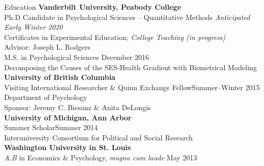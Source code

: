 \begin{rSection}{\textrm{Education}}
{\bf Vanderbilt University, Peabody College}\\
Ph.D Candidate in Psychological Sciences -- Quantitative Methods \hfill{\textit{Anticipated Early Winter 2020}}\\%
\hspace*{\pindent}Certificates in Experimental Education; \textit{College Teaching (in progress)}\\
\hspace*{\pindent}Advisor: Joseph L. Rodgers%
\smallskip\\
M.S. in Psychological Sciences \hfill{December 2016} \\
\hspace*{\pindent}Decomposing the Causes of the SES-Health Gradient with Biometrical Modeling%
\medskip\\
\textbf{University of British Columbia}\\
Visiting International Researcher \& Quinn Exchange Fellow\hfill{Summer--Winter 2015}\\
\hspace*{\pindent}Department of Psychology\\
\hspace*{\pindent}Sponsor: Jeremy C. Biesanz \& Anita DeLongis\medskip\\
\textbf{University of Michigan, Ann Arbor}\\
Summer Scholar\hfill{Summer 2014}\\
\hspace*{\pindent}Interuniversity Consortium for Political and Social Research\medskip\\
{\bf Washington University in St. Louis}\\
{\em A.B} in Economics \& Psychology, \textit{magna cum laude} \hfill{May 2013}%
\end{rSection}